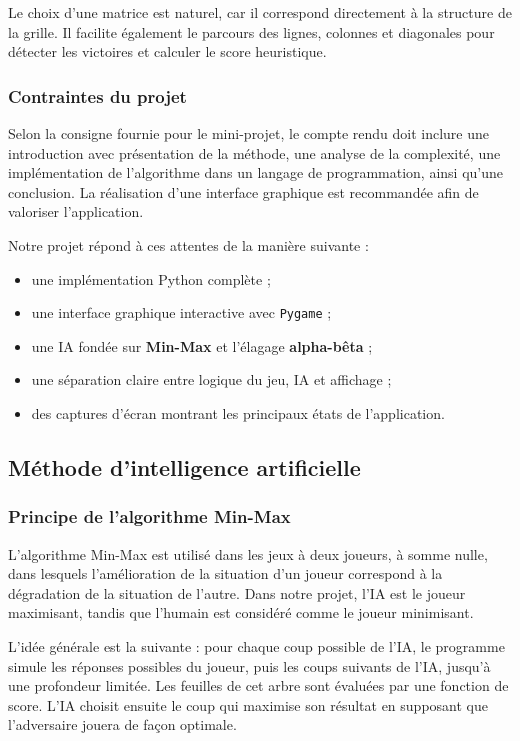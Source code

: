 \documentclass[12pt,a4paper]{article}
\newcommand{\keyword}[1]{\textbf{\textcolor{projectnavy}{#1}}}
\begin{document}
Le choix d'une matrice est naturel, car il correspond directement à la structure de la grille. Il facilite également le parcours des lignes, colonnes et diagonales pour détecter les victoires et calculer le score heuristique.

\subsubsection{Contraintes du projet}

Selon la consigne fournie pour le mini-projet, le compte rendu doit inclure une introduction avec présentation de la méthode, une analyse de la complexité, une implémentation de l'algorithme dans un langage de programmation, ainsi qu'une conclusion. La réalisation d'une interface graphique est recommandée afin de valoriser l'application.

Notre projet répond à ces attentes de la manière suivante :

\begin{itemize}[leftmargin=1.2cm]
    \item une implémentation Python complète ;
    \item une interface graphique interactive avec \texttt{Pygame} ;
    \item une IA fondée sur \keyword{Min-Max} et l'élagage \keyword{alpha-bêta} ;
    \item une séparation claire entre logique du jeu, IA et affichage ;
    \item des captures d'écran montrant les principaux états de l'application.
\end{itemize}


\subsection{Méthode d'intelligence artificielle}

\subsubsection{Principe de l'algorithme Min-Max}

L'algorithme Min-Max est utilisé dans les jeux à deux joueurs, à somme nulle, dans lesquels l'amélioration de la situation d'un joueur correspond à la dégradation de la situation de l'autre. Dans notre projet, l'IA est le joueur maximisant, tandis que l'humain est considéré comme le joueur minimisant.

L'idée générale est la suivante : pour chaque coup possible de l'IA, le programme simule les réponses possibles du joueur, puis les coups suivants de l'IA, jusqu'à une profondeur limitée. Les feuilles de cet arbre sont évaluées par une fonction de score. L'IA choisit ensuite le coup qui maximise son résultat en supposant que l'adversaire jouera de façon optimale.
\end{document}
